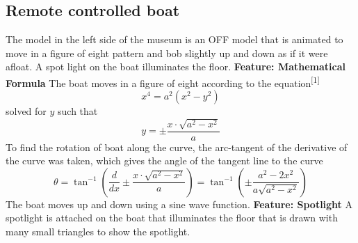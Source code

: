 \documentclass[10pt, oneside]{article}   	%
\begin{document}
\subsection{Remote controlled boat}
The model in the left side of the museum is an OFF model that is animated to move in a figure of eight pattern and bob slightly up and down as if it were afloat.  A spot light on the boat illuminates the floor.
\newline
\newline
\textbf{Feature: Mathematical Formula}\hspace{3mm} The boat moves in a figure of eight according to the equation\textsuperscript{[1]} 
\begin{equation}
x^4 = a^2(x^2-y^2)
\end{equation}
solved for $y$ such that
\begin{equation}
y = \pm \frac{x \cdot \sqrt{a^2 - x^2}}{a}
\end{equation}
To find the rotation of boat along the curve, the arc-tangent of the derivative of the curve was taken, which gives the angle of the tangent line to the curve
\begin{equation}
\theta  =  \tan^{-1}\left( \frac{d}{dx} \pm \frac{x \cdot \sqrt{a^2 - x^2}}{a} \right)  =  \tan^{-1}\left(  \pm \frac{a^2 - 2x^2}{a \sqrt{a^2 - x^2}} \right)
\end{equation}
The boat moves up and down using a sine wave function.
\newline
\newline
\textbf{Feature: Spotlight}\hspace{3mm} A spotlight is attached on the boat that illuminates the floor that is drawn with many small triangles to show the spotlight.


\end{document}
